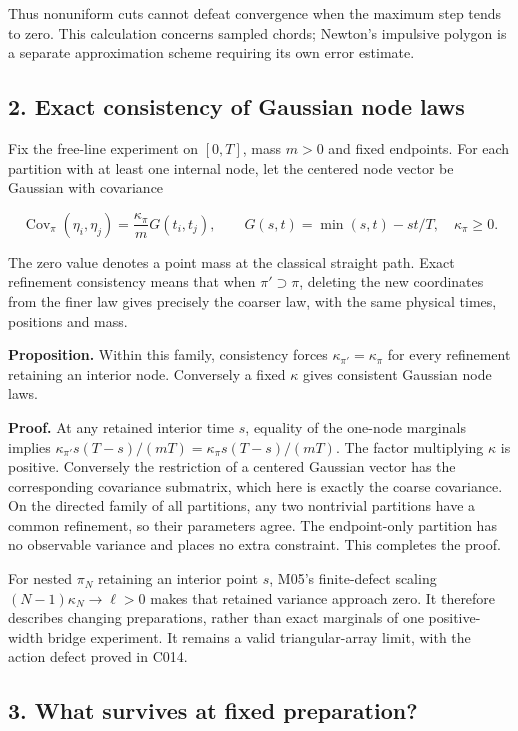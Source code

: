 \documentclass[11pt,a4paper]{article}
\begin{document}
Thus nonuniform cuts cannot defeat convergence when the maximum step
tends to zero. This calculation concerns sampled chords; Newton's
impulsive polygon is a separate approximation scheme requiring its own
error estimate.

\hypertarget{exact-consistency-of-gaussian-node-laws}{%
\subsection{2. Exact consistency of Gaussian node
laws}\label{exact-consistency-of-gaussian-node-laws}}

Fix the free-line experiment on \([0,T]\), mass \(m>0\) and fixed
endpoints. For each partition with at least one internal node, let the
centered node vector be Gaussian with covariance

\[\operatorname{Cov}_{\pi}(\eta_i,\eta_j)
=\frac{\kappa_\pi}{m}G(t_i,t_j),\qquad
G(s,t)=\min(s,t)-st/T,\quad \kappa_\pi\ge0.\]

The zero value denotes a point mass at the classical straight path.
Exact refinement consistency means that when \(\pi'\supset\pi\),
deleting the new coordinates from the finer law gives precisely the
coarser law, with the same physical times, positions and mass.

\textbf{Proposition.} Within this family, consistency forces
\(\kappa_{\pi'}=\kappa_\pi\) for every refinement retaining an interior
node. Conversely a fixed \(\kappa\) gives consistent Gaussian node laws.

\textbf{Proof.} At any retained interior time \(s\), equality of the
one-node marginals implies
\(\kappa_{\pi'}s(T-s)/(mT)=\kappa_\pi s(T-s)/(mT)\). The factor
multiplying \(\kappa\) is positive. Conversely the restriction of a
centered Gaussian vector has the corresponding covariance submatrix,
which here is exactly the coarse covariance. On the directed family of
all partitions, any two nontrivial partitions have a common refinement,
so their parameters agree. The endpoint-only partition has no observable
variance and places no extra constraint. This completes the proof.

For nested \(\pi_N\) retaining an interior point \(s\), M05's
finite-defect scaling \((N-1)\kappa_N\to\ell>0\) makes that retained
variance approach zero. It therefore describes changing preparations,
rather than exact marginals of one positive-width bridge experiment. It
remains a valid triangular-array limit, with the action defect proved in
C014.

\hypertarget{what-survives-at-fixed-preparation}{%
\subsection{3. What survives at fixed
preparation?}\label{what-survives-at-fixed-preparation}}
\end{document}
